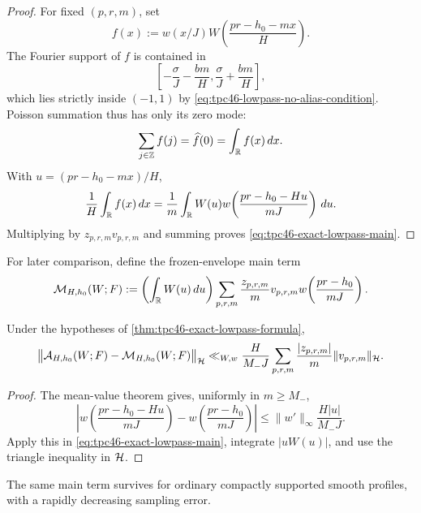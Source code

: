 \begin{proof}
For fixed \((p,r,m)\), set
\[
 f(x):=w(x/J)W\!\left(\frac{pr-h_0-mx}{H}\right).
\]
The Fourier support of \(f\) is contained in
\[
 \left[-\frac{\sigma}{J}-\frac{bm}{H},
       \frac{\sigma}{J}+\frac{bm}{H}\right],
\]
which lies strictly inside \((-1,1)\) by
\eqref{eq:tpc46-lowpass-no-alias-condition}.  Poisson summation thus
has only its zero mode:
\[
 \sum_{j\in\mathbb Z}f(j)=\widehat f(0)=\int_{\mathbb R}f(x)\,dx.
\]
With \(u=(pr-h_0-mx)/H\),
\[
 \frac1H\int_{\mathbb R}f(x)\,dx
 =\frac1m\int_{\mathbb R}W(u)
 w\!\left(\frac{pr-h_0-Hu}{mJ}\right)\,du.
\]
Multiplying by \(z_{p,r,m}v_{p,r,m}\) and summing proves
\eqref{eq:tpc46-exact-lowpass-main}.
\end{proof}

For later comparison, define the frozen-envelope main term
\begin{equation}
 \mathcal M_{H,h_0}(W;F)
 :=\left(\int_{\mathbb R}W(u)\,du\right)
 \sum_{p,r,m}
 \frac{z_{p,r,m}}{m}v_{p,r,m}
 w\!\left(\frac{pr-h_0}{mJ}\right).
 \label{eq:tpc46-frozen-envelope-main}
\end{equation}

\begin{corollary}
\label{cor:tpc46-lowpass-main-variation}
Under the hypotheses of
\cref{thm:tpc46-exact-lowpass-formula},
\begin{align}
 \bigl\|\mathcal A_{H,h_0}(W;F)-\mathcal M_{H,h_0}(W;F)\bigr\|_{\mathcal H}
 \ll_{W,w}
 \frac{H}{M_-J}
 \sum_{p,r,m}
 \frac{|z_{p,r,m}|}{m}\|v_{p,r,m}\|_{\mathcal H}.
 \label{eq:tpc46-exact-main-variation-bound}
\end{align}
\end{corollary}

\begin{proof}
The mean-value theorem gives, uniformly in \(m\ge M_-\),
\[
 \left|
 w\!\left(\frac{pr-h_0-Hu}{mJ}\right)
 -w\!\left(\frac{pr-h_0}{mJ}\right)
 \right|
 \le \|w'\|_\infty\frac{H|u|}{M_-J}.
\]
Apply this in \eqref{eq:tpc46-exact-lowpass-main}, integrate
\(|uW(u)|\), and use the triangle inequality in \(\mathcal H\).
\end{proof}

The same main term survives for ordinary compactly supported smooth
profiles, with a rapidly decreasing sampling error.

